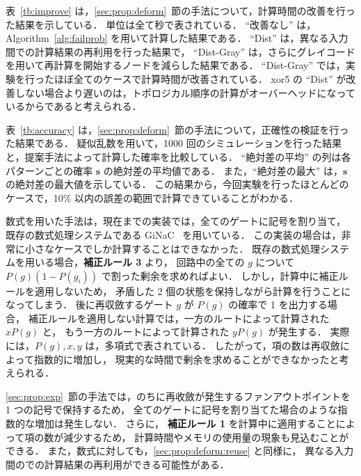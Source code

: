 表~\ref{tb:improve} は，\ref{sec:prop:deform}~節の手法について，計算時間の改善を行った結果を示している．
単位は全て秒で表されている．
``改善なし'' は，Algorithm~\ref{alg:failprob} を用いて計算した結果である．
``Dist'' は，異なる入力間での計算結果の再利用を行った結果で，
``Dist-Gray'' は，さらにグレイコードを用いて再計算を開始するノードを減らした結果である．
``Dist-Gray'' では，実験を行ったほぼ全てのケースで計算時間が改善されている．
xor5 の ``Dist'' が改善しない場合より遅いのは，トポロジカル順序の計算がオーバーヘッドになっているからであると考えられる．

表~\ref{tb:accuracy} は，\ref{sec:prop:deform}~節の手法について，正確性の検証を行った結果である．
疑似乱数を用いて，1000 回のシミュレーションを行った結果と，提案手法によって計算した確率を比較している．
``絶対差の平均'' の列は各パターンごとの確率 ${\bm s}$ の絶対差の平均値である．
また，``絶対差の最大'' は，${\bm s}$ の絶対差の最大値を示している．
この結果から，今回実験を行ったほとんどのケースで，10\% 以内の誤差の範囲で計算できていることがわかる．

数式を用いた手法は，現在までの実装では，全てのゲートに記号を割り当て，
既存の数式処理システムである GiNaC~\cite{GiNaC} を用いている．
この実装の場合は，非常に小さなケースでしか計算することはできなかった．
既存の数式処理システムを用いる場合，{\bf 補正ルール 3} より，
回路中の全ての $g$ について $P(g) (1 - P(g_i))$ で割った剰余を求めればよい．
しかし，計算中に補正ルールを適用しないため，
矛盾した 2 個の状態を保持しながら計算を行うことになってしまう．
後に再収斂するゲート $g$ が $P(g)$ の確率で 1 を出力する場合，
補正ルールを適用しない計算では，一方のルートによって計算された $x P(g)$ と，
もう一方のルートによって計算された $y P(g)$ が発生する．
実際には，$P(g), x, y$ は，多項式で表されている．
したがって，項の数は再収斂によって指数的に増加し，
現実的な時間で剰余を求めることができなかったと考えられる．

\ref{sec:prop:exp}~節の手法では，のちに再收斂が発生するファンアウトポイントを 1 つの記号で保持するため，
全てのゲートに記号を割り当てた場合のような指数的な増加は発生しない．
さらに， {\bf 補正ルール 1} を計算中に適用することによって項の数が減少するため，
計算時間やメモリの使用量の現象も見込むことができる．
また，数式に対しても，\ref{sec:prop:deform:reuse} と同様に，
異なる入力間のでの計算結果の再利用ができる可能性がある．
